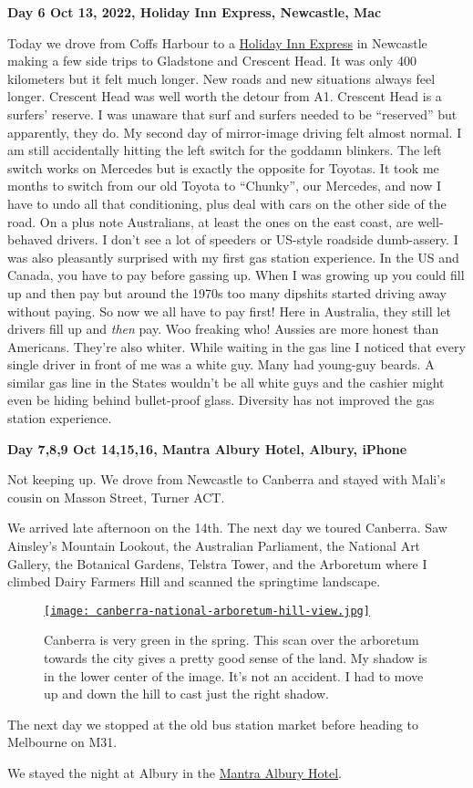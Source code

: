 \textbf{Day 6 Oct 13, 2022, Holiday Inn Express, Newcastle, Mac}

Today we drove from Coffs Harbour to a
\href{https://www.ihg.com/holidayinnexpress/hotels/us/en/newcastle/ntlnc/hoteldetail}{Holiday
Inn Express} in Newcastle making a few side trips to Gladstone and
Crescent Head. It was only 400 kilometers but it felt much longer. New
roads and new situations always feel longer. Crescent Head was well
worth the detour from A1. Crescent Head is a surfers' reserve. I was
unaware that surf and surfers needed to be ``reserved'' but apparently,
they do. My second day of mirror-image driving felt almost normal. I am
still accidentally hitting the left switch for the goddamn blinkers. The
left switch works on Mercedes but is exactly the opposite for Toyotas.
It took me months to switch from our old Toyota to ``Chunky'', our
Mercedes, and now I have to undo all that conditioning, plus deal with
cars on the other side of the road. On a plus note Australians, at least
the ones on the east coast, are well-behaved drivers. I don't see a lot
of speeders or US-style roadside dumb-assery. I was also pleasantly
surprised with my first gas station experience. In the US and Canada,
you have to pay before gassing up. When I was growing up you could fill
up and then pay but around the 1970s too many dipshits started driving
away without paying. So now we all have to pay first! Here in Australia,
they still let drivers fill up and \textit{then} pay. Woo freaking who! Aussies are
more honest than Americans. They're also whiter. While waiting in the
gas line I noticed that every single driver in front of me was a white
guy. Many had young-guy beards. A similar gas line in the States
wouldn't be all white guys and the cashier might even be hiding behind
bullet-proof glass. Diversity has not improved the gas station
experience.

\textbf{Day 7,8,9 Oct 14,15,16, Mantra Albury Hotel, Albury, iPhone}

Not keeping up. We drove from Newcastle to Canberra and stayed with
Mali's cousin on Masson Street, Turner ACT.

We arrived late afternoon on the 14th. The next day we toured Canberra.
Saw Ainsley's Mountain Lookout, the Australian Parliament, the National
Art Gallery, the Botanical Gardens, Telstra Tower, and the Arboretum
where I climbed Dairy Farmers Hill and scanned the springtime landscape.

\captionsetup[figure]{labelformat=empty}
\begin{figure}[htbp]
\centering
\href{https://conceptcontrol.smugmug.com/Trips/Overseas/Australia-New-Zealand-2022/i-693fxcR/A}{\texttt{[image: canberra-national-arboretum-hill-view.jpg]}}
\caption[Canberra is very green in the spring]{Canberra is very green in the spring. This scan over the
arboretum towards the city gives a pretty good sense of the land. My
shadow is in the lower center of the image. It's not an accident. I had
to move up and down the hill to cast just the right shadow.}
\label{fig:7548x3}
\end{figure}


The next day we stopped at the old bus station market before heading to
Melbourne on M31.

We stayed the night at Albury in the
\href{https://www.mantraalbury.com.au/}{Mantra Albury Hotel}.

%
